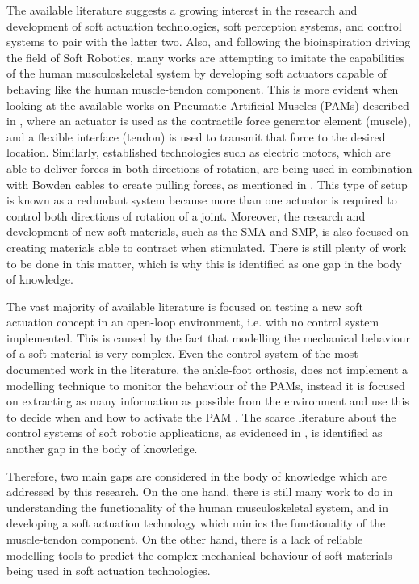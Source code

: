 The available literature suggests a growing interest in the research and development of soft actuation technologies, soft perception systems, and control systems to pair with the latter two. Also, and following the bioinspiration driving the field of Soft Robotics, many works are attempting to imitate the capabilities of the human musculoskeletal system by developing soft actuators capable of behaving like the human muscle-tendon component. This is more evident when looking at the available works on Pneumatic Artificial Muscles (PAMs) described in , where an actuator is used as the contractile force generator element (muscle), and a flexible interface (tendon) is used to transmit that force to the desired location. Similarly, established technologies such as electric motors, which are able to deliver forces in both directions of rotation, are being used in combination with Bowden cables to create pulling forces, as mentioned in . This type of setup is known as a redundant system because more than one actuator is required to control both directions of rotation of a joint. Moreover, the research and development of new soft materials, such as the SMA and SMP, is also focused on creating materials able to contract when stimulated. There is still plenty of work to be done in this matter, which is why this is identified as one gap in the body of knowledge.

The vast majority of available literature is focused on testing a new soft actuation concept in an open-loop environment, i.e. with no control system implemented. This is caused by the fact that modelling the mechanical behaviour of a soft material is very complex. Even the control system of the most documented work in the literature, the ankle-foot orthosis, does not implement a modelling technique to monitor the behaviour of the PAMs, instead it is focused on extracting as many information as possible from the environment and use this to decide when and how to activate the PAM \cite{park2011bio}. The scarce literature about the control systems of soft robotic applications, as evidenced in , is identified as another gap in the body of knowledge.

Therefore, two main gaps are considered in the body of knowledge which are addressed by this research. On the one hand, there is still many work to do in understanding the functionality of the human musculoskeletal system, and in developing a soft actuation technology which mimics the functionality of the muscle-tendon component. On the other hand, there is a lack of reliable modelling tools to predict the complex mechanical behaviour of soft materials being used in soft actuation technologies. 

